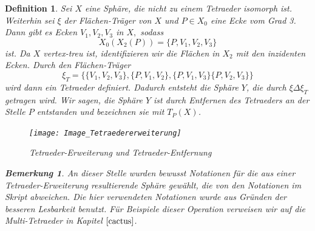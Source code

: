 \documentclass[12pt,titlepage,twoside,cleardoublepage]{article}
\theoremstyle{nummermitklammern}
\newtheorem{definition}[temp]{Definition}
\newtheorem{bemerkung}[temp]{Bemerkung}
\newtheorem{definition}[zahl]{Definition}
\newtheorem{bemerkung}[zahl]{Bemerkung}
\numberwithin{equation}{section}
\begin{document}
\begin{definition}
Sei $X$ eine Sphäre, die nicht zu einem Tetraeder isomorph ist.
Weiterhin sei $\xi$ der Flächen-Träger von $X$ und $P\in X_0$ eine Ecke vom Grad 3. Dann gibt es Ecken $V_1,V_2,V_3$ in $X,$ sodass
\[
X_0(X_2(P))=\{P,V_1,V_2,V_3\}
\] 
ist. Da $X$ vertex-treu ist, identifizieren wir die Flächen in $X_2$  mit den inzidenten Ecken. Durch den Flächen-Träger 
\[
\xi_T=\{\{V_1,V_2,V_3\},\{P,V_1,V_2\},\{P,V_1,V_3\}\{P,V_2,V_3\}\}
\]
 wird dann ein Tetraeder definiert. 
  Dadurch entsteht die Sphäre $Y$, die durch $\xi \Delta \xi_T$ getragen wird. Wir sagen, die Sphäre $Y$ ist durch Entfernen des Tetraeders an der Stelle $P$ entstanden und bezeichnen sie mit $T_P(X)$.
\begin{figure}[H]
\begin{center}
\texttt{[image: Image\_Tetraedererweiterung]}
\end{center}
\caption{Tetraeder-Erweiterung und Tetraeder-Entfernung}
\end{figure}
\begin{bemerkung}
An dieser Stelle wurden bewusst Notationen für die aus einer Tetraeder-Erweiterung resultierende Sphäre gewählt, die von den Notationen im Skript abweichen. Die hier verwendeten Notationen wurde aus Gründen der besseren Lesbarkeit benutzt. Für Beispiele dieser Operation verweisen wir auf die Multi-Tetraeder in Kapitel $\ref{cactus}$.
\end{bemerkung}
\end{definition}
\end{document}
